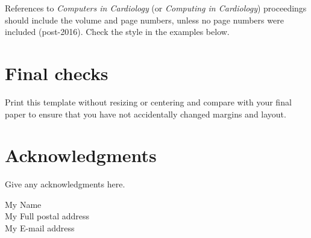 \documentclass[twocolumn]{cinc}
\begin{document}
References to \emph{Computers in Cardiology} (or \emph{Computing in
  Cardiology}) proceedings should include the volume and page numbers,
unless no page numbers were included (post-2016). Check the style in the
examples below.


\section{ Final checks }     
 
Print this template without resizing or centering and compare with your
final paper to ensure that you have not accidentally changed margins and
layout.


\section*{Acknowledgments}  
% 
Give any acknowledgments here.





  
  
      


\begin{correspondence}
My Name\\
My Full postal address\\
My E-mail address
\end{correspondence}
\end{document}
